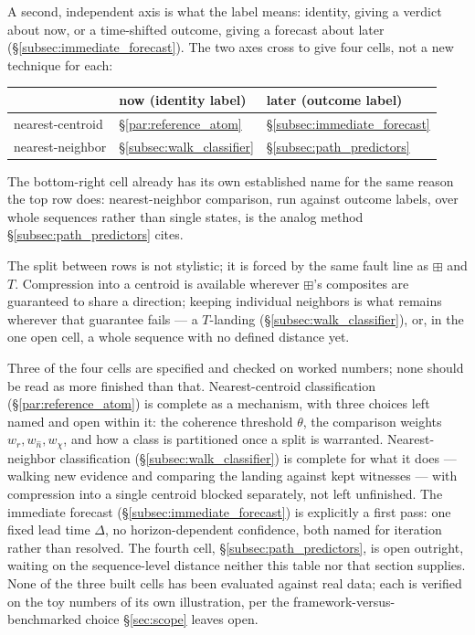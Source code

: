 \documentclass[12pt, a4paper]{article}
\begin{document}
A second, independent axis is what the label means: identity, giving
a verdict about now, or a time-shifted outcome, giving a forecast
about later (\S\ref{subsec:immediate_forecast}). The two axes cross
to give four cells, not a new technique for each:

\begin{center}
\begin{tabular}{lll}
\hline
 & now (identity label) & later (outcome label) \\
\hline
nearest-centroid &
  \S\ref{par:reference_atom} &
  \S\ref{subsec:immediate_forecast} \\
nearest-neighbor &
  \S\ref{subsec:walk_classifier} &
  \S\ref{subsec:path_predictors} \\
\hline
\end{tabular}
\end{center}

The bottom-right cell already has its own established name for the
same reason the top row does: nearest-neighbor comparison, run
against outcome labels, over whole sequences rather than single
states, is the analog method \S\ref{subsec:path_predictors} cites.

The split between rows is not stylistic; it is forced by the same
fault line as $\boxplus$ and $T$. Compression into a centroid is
available wherever $\boxplus$'s composites are guaranteed to share a
direction; keeping individual neighbors is what remains wherever that
guarantee fails --- a $T$-landing (\S\ref{subsec:walk_classifier}),
or, in the one open cell, a whole sequence with no defined distance
yet.

Three of the four cells are specified and checked on worked numbers;
none should be read as more finished than that. Nearest-centroid
classification (\S\ref{par:reference_atom}) is complete as a
mechanism, with three choices left named and open within it: the
coherence threshold $\theta$, the comparison weights
$w_r,w_{\hat n},w_\chi$, and how a class is partitioned once a split
is warranted. Nearest-neighbor classification
(\S\ref{subsec:walk_classifier}) is complete for what it does ---
walking new evidence and comparing the landing against kept
witnesses --- with compression into a single centroid blocked
separately, not left unfinished. The immediate forecast
(\S\ref{subsec:immediate_forecast}) is explicitly a first pass: one
fixed lead time $\Delta$, no horizon-dependent confidence, both named
for iteration rather than resolved. The fourth cell,
\S\ref{subsec:path_predictors}, is open outright, waiting on the
sequence-level distance neither this table nor that section
supplies. None of the three built cells has been evaluated against
real data; each is verified on the toy numbers of its own
illustration, per the framework-versus-benchmarked choice
\S\ref{sec:scope} leaves open.
\end{document}
